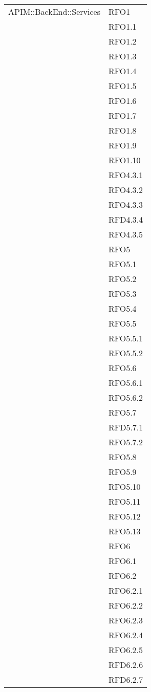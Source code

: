 \begin{longtable}{ p{12cm} | p{4cm} }
			\hline
			APIM::BackEnd::Services
			& RFO1 \\
			& RFO1.1 \\
			& RFO1.2 \\
			& RFO1.3 \\
			& RFO1.4 \\
			& RFO1.5 \\
			& RFO1.6 \\
			& RFO1.7 \\
			& RFO1.8 \\
			& RFO1.9 \\
			& RFO1.10 \\
			& RFO4.3.1 \\
			& RFO4.3.2 \\
			& RFO4.3.3 \\
			& RFD4.3.4 \\
			& RFO4.3.5 \\
			& RFO5 \\
			& RFO5.1 \\
			& RFO5.2 \\
			& RFO5.3 \\
			& RFO5.4 \\
			& RFO5.5 \\
			& RFO5.5.1 \\
			& RFO5.5.2 \\
			& RFO5.6 \\
			& RFO5.6.1 \\
			& RFO5.6.2 \\
			& RFO5.7 \\
			& RFD5.7.1 \\
			& RFO5.7.2 \\
			& RFO5.8 \\
			& RFO5.9 \\
			& RFO5.10 \\
			& RFO5.11 \\
			& RFO5.12 \\
			& RFO5.13 \\
			& RFO6 \\
			& RFO6.1 \\
			& RFO6.2 \\
			& RFO6.2.1 \\
			& RFO6.2.2 \\
			& RFO6.2.3 \\
			& RFO6.2.4 \\
			& RFO6.2.5 \\
			& RFD6.2.6 \\
			& RFD6.2.7 \\

\end{longtable}
